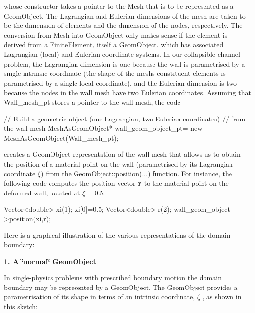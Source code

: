whose constructor takes a pointer to the {\ttfamily Mesh} that is to be represented as a {\ttfamily Geom\+Object}. The Lagrangian and Eulerian dimensions of the mesh are taken to be the dimension of elements and the dimension of the nodes, respectively. The conversion from {\ttfamily Mesh} into {\ttfamily Geom\+Object} only makes sense if the element is derived from a {\ttfamily Finite\+Element}, itself a {\ttfamily Geom\+Object}, which has associated Lagrangian (local) and Eulerian coordinate systems. In our collapsible channel problem, the Lagrangian dimension is one because the wall is parametrised by a single intrinsic coordinate (the shape of the mesh\textquotesingle{}s constituent elements is parametrised by a single local coordinate), and the Eulerian dimension is two because the nodes in the wall mesh have two Eulerian coordinates. Assuming that {\ttfamily Wall\+\_\+mesh\+\_\+pt} stores a pointer to the wall mesh, the code

 
\begin{DoxyCodeInclude}
 \textcolor{comment}{// Build a geometric object (one Lagrangian, two Eulerian coordinates)}
 \textcolor{comment}{// from the wall mesh}
 MeshAsGeomObject* wall\_geom\_object\_pt=
  \textcolor{keyword}{new} MeshAsGeomObject(Wall\_mesh\_pt); 

\end{DoxyCodeInclude}


creates a {\ttfamily Geom\+Object} representation of the wall mesh that allows us to obtain the position of a material point on the wall (parametrised by its Lagrangian coordinate $\xi $) from the {\ttfamily Geom\+Object\+::position}(...) function. For instance, the following code computes the position vector $ {\bf r} $ to the material point on the deformed wall, located at $ \xi=0.5. $ 
\begin{DoxyCode}
Vector<double> xi(1);
xi[0]=0.5;
Vector<double> r(2);
wall\_geom\_object->position(xi,r);
\end{DoxyCode}


Here is a graphical illustration of the various representations of the domain boundary\+:

{\bfseries 1. A \char`\"{}normal\char`\"{} Geom\+Object}

In single-\/physics problems with prescribed boundary motion the domain boundary may be represented by a {\ttfamily Geom\+Object}. The {\ttfamily Geom\+Object} provides a parametrisation of its shape in terms of an intrinsic coordinate, $ \zeta $ , as shown in this sketch\+:

